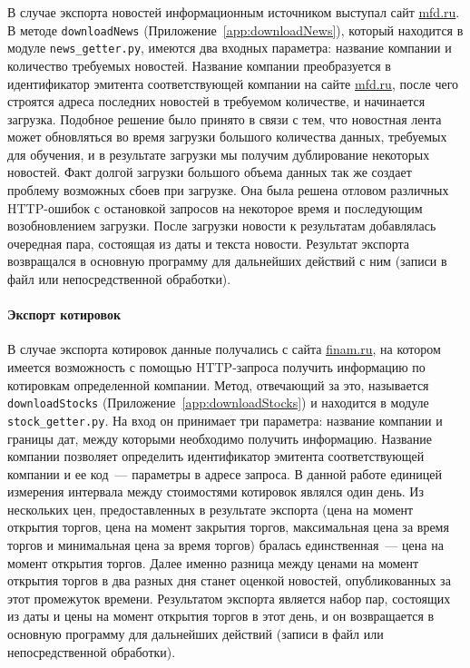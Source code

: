 \documentclass[14pt]{matmex-diploma-custom}
\begin{document}
В случае экспорта новостей информационным источником выступал сайт \url{mfd.ru}. В методе \texttt{downloadNews} (Приложение~\ref{app:downloadNews}), который находится в модуле \texttt{news\_getter.py}, имеются два входных параметра: название компании и количество требуемых новостей. Название компании преобразуется в идентификатор эмитента соответствующей компании на сайте \url{mfd.ru}, после чего строятся адреса последних новостей в требуемом количестве, и начинается загрузка. Подобное решение было принято в связи с тем, что новостная лента может обновляться во время загрузки большого количества данных, требуемых для обучения, и в результате загрузки мы получим дублирование некоторых новостей. Факт долгой загрузки большого объема данных так же создает проблему возможных сбоев при загрузке. Она была решена отловом различных HTTP-ошибок с остановкой запросов на некоторое время и последующим возобновлением загрузки. После загрузки новости к результатам добавлялась очередная пара, состоящая из даты и текста новости. Результат экспорта возвращался в основную программу для дальнейших действий с ним (записи в файл или непосредственной обработки).

\paragraph{Экспорт котировок}

В случае экспорта котировок данные получались с сайта \url{finam.ru}, на котором имеется возможность с помощью HTTP-запроса получить информацию по котировкам определенной компании. Метод, отвечающий за это, называется \texttt{downloadStocks} (Приложение~\ref{app:downloadStocks}) и находится в модуле \texttt{stock\_getter.py}. На вход он принимает три параметра: название компании и границы дат, между которыми необходимо получить информацию. Название компании позволяет определить идентификатор эмитента соответствующей компании и ее код~--- параметры в адресе запроса. В данной работе единицей измерения интервала между стоимостями котировок являлся один день. Из нескольких цен, предоставленных в результате экспорта (цена на момент открытия торгов, цена на момент закрытия торгов, максимальная цена за время торгов и минимальная цена за время торгов) бралась единственная~--- цена на момент открытия торгов. Далее именно разница между ценами на момент открытия торгов в два разных дня станет оценкой новостей, опубликованных за этот промежуток времени. Результатом экспорта является набор пар, состоящих из даты и цены на момент открытия торгов в этот день, и он возвращается в основную программу для дальнейших действий (записи в файл или непосредственной обработки).
\end{document}
